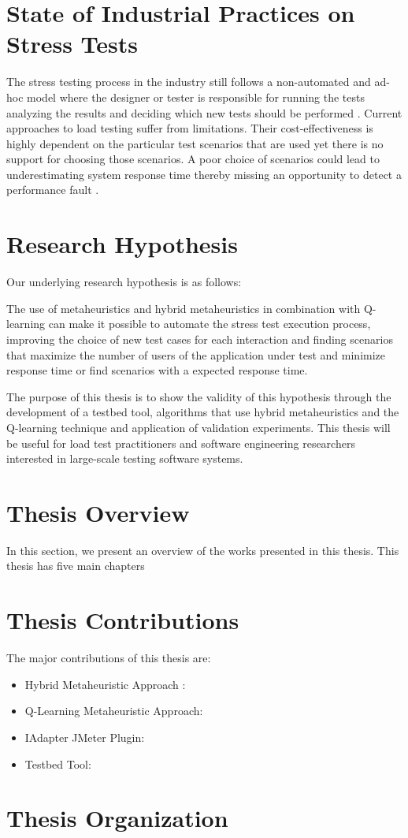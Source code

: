 \section{State of Industrial Practices on Stress Tests}

The stress testing process in the industry still follows a non-automated and ad-hoc model where the designer or tester is responsible for running the tests analyzing the results and deciding which new tests should be performed \cite{Lewis2005}. Current approaches to load testing suffer from limitations. Their cost-effectiveness is highly dependent on the particular test scenarios that are used yet there is no support for choosing those scenarios. A poor choice of scenarios could lead to underestimating system response time thereby missing an opportunity to detect a performance fault \cite{Zhang2011}.


\section{Research Hypothesis}





Our underlying research hypothesis is as follows:

\begin{mybox}
The use of metaheuristics and hybrid metaheuristics in combination with Q-learning can make it possible to automate the stress test execution process, improving the choice of new test cases for each interaction and finding scenarios that maximize the number of users of the application under test and minimize response time or find scenarios with a expected response time.
\end{mybox}

The purpose of this thesis is to show the validity of this hypothesis through the development of a testbed tool, algorithms that use hybrid metaheuristics and the Q-learning technique and application of validation experiments. This thesis will be useful for load test practitioners and software engineering researchers interested in large-scale testing software systems.


\section{Thesis Overview}

In this section, we present an overview of the works presented in this thesis. This thesis has five main chapters

\section{Thesis Contributions}

The major contributions of this thesis are:

\begin{itemize}
\item Hybrid Metaheuristic Approach \cite{Gois2016}: 
\item Q-Learning Metaheuristic Approach: 
\item IAdapter JMeter Plugin:
\item Testbed Tool: 
\end{itemize}




\section{Thesis Organization}



